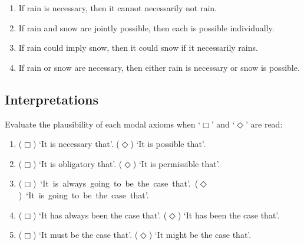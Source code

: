 \documentclass[a4paper, 11pt]{article}                  %
\begin{document}
\begin{enumerate}
	\item If rain is necessary, then it cannot necessarily not rain.

	\item If rain and snow are jointly possible, then each is possible individually.

	\item If rain could imply snow, then it could snow if it necessarily rains.

	\item If rain or snow are necessary, then either rain is necessary or snow is possible.

\end{enumerate}




\subsection{Interpretations}

Evaluate the plausibility of each modal axioms when `$\Box$' and `$\Diamond$' are read:

\begin{enumerate}

	\item ($\Box$) `It is necessary that'. ($\Diamond$) `It is possible that'.

	\item ($\Box$) `It is obligatory that'. ($\Diamond$) `It is permissible that'.

	\item \mbox{($\Box$) `It is always going to be the case that'. ($\Diamond$) `It is going to be the case that'.}

	\item ($\Box$) `It has always been the case that'. ($\Diamond$) `It has been the case that'.

	\item ($\Box$) `It must be the case that'. ($\Diamond$) `It might be the case that'.


\end{enumerate}
\end{document}

